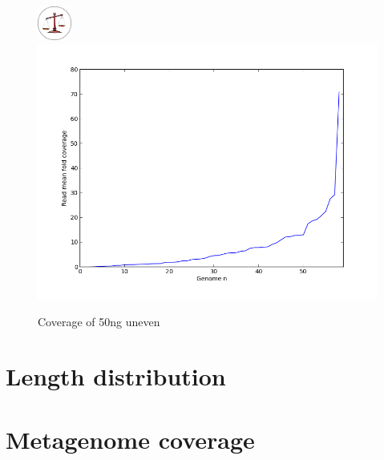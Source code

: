 \documentclass[a4paper,12pt]{report}
\begin{document}
\begin{figure}[ht!]
  \centering
    \includegraphics[width=0.1\textwidth]{figures/logos/uneven.png}\\
  \centering
    \includegraphics[width=\textwidth,trim=0 0 0 40, clip]{figures/notebooks/chris-mock-uneven-distribution.png}
  \caption{Coverage of 50ng uneven}
  \label{fig:coverage50nguneven}
\end{figure}


\section{Length distribution}



\section{Metagenome coverage}
\end{document}
